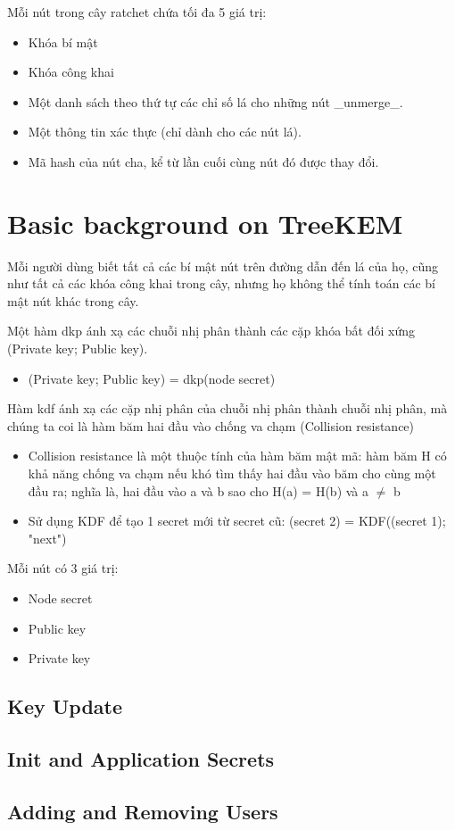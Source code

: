 \documentclass[../main-report.tex]{subfiles}
\begin{document}
Mỗi nút trong cây ratchet chứa tối đa 5 giá trị:

\begin{itemize}
\item{Khóa bí mật}
\item{Khóa công khai}
\item{Một danh sách theo thứ tự các chỉ số lá cho những nút \_unmerge\_.}
\item{Một thông tin xác thực (chỉ dành cho các nút lá).}
\item{Mã hash của nút cha, kể từ lần cuối cùng nút đó được thay đổi.}
\end{itemize}

\section{Basic background on TreeKEM}
Mỗi người dùng biết tất cả các bí mật nút trên đường dẫn đến lá của họ, cũng như tất cả các khóa công khai trong cây, nhưng họ không thể tính toán các bí mật nút khác trong cây.

Một hàm \acrfull{dkp} ánh xạ các chuỗi nhị phân thành các cặp khóa bất đối xứng (\gls{Private key}; \gls{Public key}).

\begin{itemize}
\item{(\gls{Private key}; \gls{Public key}) = \acrshort{dkp}(node secret)}
\end{itemize}

Hàm \acrfull{kdf} ánh xạ các cặp nhị phân của chuỗi nhị phân thành chuỗi nhị phân, mà chúng ta coi là hàm băm hai đầu vào chống va chạm (Collision resistance)

\begin{itemize}
\item{Collision resistance là một thuộc tính của hàm băm mật mã: hàm băm H có khả năng chống va chạm nếu khó tìm thấy hai đầu vào băm cho cùng một đầu ra; nghĩa là, hai đầu vào a và b sao cho H(a) = H(b) và a $\neq$ b}
\item{Sử dụng KDF để tạo 1 secret mới từ secret cũ: (secret 2) = KDF((secret 1); "next")}
\end{itemize}

Mỗi nút có 3 giá trị:

\begin{itemize}
\item{Node secret}
\item{\gls{Public key}}
\item{\gls{Private key}}
\end{itemize}

\subsection{Key Update}




\subsection{Init and Application Secrets}

\subsection{Adding and Removing Users}
\end{document}
